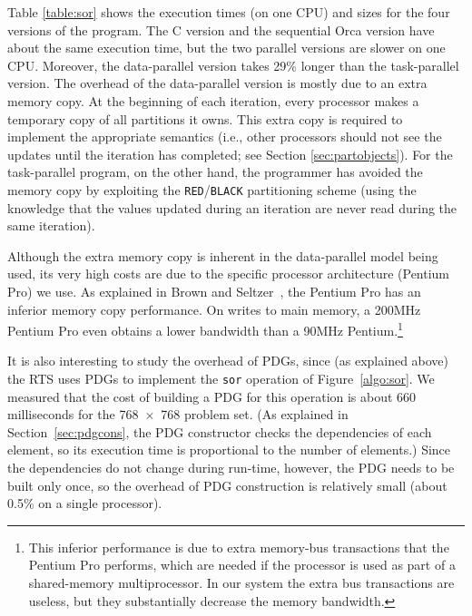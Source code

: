 \documentclass{acmtrans2e}
\begin{document}
Table \ref{table:sor} shows the execution times (on one CPU) and sizes
for the four versions of the program.
The C version and the sequential Orca version have about the same
execution time, but the two parallel versions are slower on one CPU.
Moreover, the data-parallel version takes 29\% longer than the task-parallel
version.
The overhead of the data-parallel version is mostly due to an extra memory copy.
At the beginning of each iteration, every processor makes a temporary
copy of all partitions it owns.  This extra copy is required to implement
the appropriate semantics (i.e., other processors should not see the updates
until the iteration has completed; see Section \ref{sec:partobjects}).
For the task-parallel program, on the other hand, the programmer has
avoided the memory copy by exploiting the \verb+RED+/\verb+BLACK+ partitioning
scheme (using the knowledge that the values updated during
an iteration are never read during the same iteration).

Although the extra memory copy is inherent in the data-parallel model
being used, its very high costs are due to the specific processor
architecture (Pentium Pro) we use. As explained in
Brown and Seltzer~\citeyear{Brown:1997},
the Pentium Pro has an inferior memory copy performance. On writes
to main memory, a 200MHz Pentium Pro even obtains a lower bandwidth
than a 90MHz Pentium.\footnote{This inferior performance is due to
extra memory-bus transactions that the Pentium Pro performs, which
are needed if the processor is used as part of a shared-memory multiprocessor.
In our system the extra bus transactions are useless, but they substantially
decrease the memory bandwidth.}

It is also interesting to study the overhead of PDGs, since (as explained
above) the RTS uses PDGs to implement the \verb+sor+ operation
of Figure~\ref{algo:sor}.
We measured that the cost of building a PDG for this operation
is about 660 milliseconds for the 768~$\times$~768 problem set.
(As explained in Section~\ref{sec:pdgcons}, the PDG constructor checks
the dependencies of each element, so its execution time is proportional
to the number of elements.)
Since the dependencies do not change during run-time, however, the PDG
needs to be built only once, so the overhead of PDG construction
is relatively small (about 0.5\% on a single processor).

\end{document}
